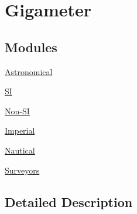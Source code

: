 \hypertarget{group___e_g_x_math-_conversions-_length_conversions-_gigameter}{}\section{Gigameter}
\label{group___e_g_x_math-_conversions-_length_conversions-_gigameter}
\subsection*{Modules}
\begin{DoxyCompactItemize}
\item 
\mbox{\hyperlink{group___e_g_x_math-_conversions-_length_conversions-_gigameter-_astronomical}{Astronomical}}
\item 
\mbox{\hyperlink{group___e_g_x_math-_conversions-_length_conversions-_gigameter-_s_i}{SI}}
\item 
\mbox{\hyperlink{group___e_g_x_math-_conversions-_length_conversions-_gigameter-_non-_s_i}{Non-\/\+SI}}
\item 
\mbox{\hyperlink{group___e_g_x_math-_conversions-_length_conversions-_gigameter-_imperial}{Imperial}}
\item 
\mbox{\hyperlink{group___e_g_x_math-_conversions-_length_conversions-_gigameter-_nautical}{Nautical}}
\item 
\mbox{\hyperlink{group___e_g_x_math-_conversions-_length_conversions-_gigameter-_surveyors}{Surveyors}}
\end{DoxyCompactItemize}


\subsection{Detailed Description}
